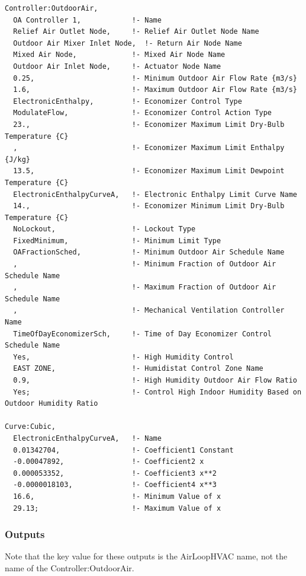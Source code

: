 \begin{lstlisting}
Controller:OutdoorAir,
  OA Controller 1,            !- Name
  Relief Air Outlet Node,     !- Relief Air Outlet Node Name
  Outdoor Air Mixer Inlet Node,  !- Return Air Node Name
  Mixed Air Node,             !- Mixed Air Node Name
  Outdoor Air Inlet Node,     !- Actuator Node Name
  0.25,                       !- Minimum Outdoor Air Flow Rate {m3/s}
  1.6,                        !- Maximum Outdoor Air Flow Rate {m3/s}
  ElectronicEnthalpy,         !- Economizer Control Type
  ModulateFlow,               !- Economizer Control Action Type
  23.,                        !- Economizer Maximum Limit Dry-Bulb Temperature {C}
  ,                           !- Economizer Maximum Limit Enthalpy {J/kg}
  13.5,                       !- Economizer Maximum Limit Dewpoint Temperature {C}
  ElectronicEnthalpyCurveA,   !- Electronic Enthalpy Limit Curve Name
  14.,                        !- Economizer Minimum Limit Dry-Bulb Temperature {C}
  NoLockout,                  !- Lockout Type
  FixedMinimum,               !- Minimum Limit Type
  OAFractionSched,            !- Minimum Outdoor Air Schedule Name
  ,                           !- Minimum Fraction of Outdoor Air Schedule Name
  ,                           !- Maximum Fraction of Outdoor Air Schedule Name
  ,                           !- Mechanical Ventilation Controller Name
  TimeOfDayEconomizerSch,     !- Time of Day Economizer Control Schedule Name
  Yes,                        !- High Humidity Control
  EAST ZONE,                  !- Humidistat Control Zone Name
  0.9,                        !- High Humidity Outdoor Air Flow Ratio
  Yes;                        !- Control High Indoor Humidity Based on Outdoor Humidity Ratio

Curve:Cubic,
  ElectronicEnthalpyCurveA,   !- Name
  0.01342704,                 !- Coefficient1 Constant
  -0.00047892,                !- Coefficient2 x
  0.000053352,                !- Coefficient3 x**2
  -0.0000018103,              !- Coefficient4 x**3
  16.6,                       !- Minimum Value of x
  29.13;                      !- Maximum Value of x
\end{lstlisting}

\subsubsection{Outputs}\label{outputs-005}

Note that the key value for these outputs is the AirLoopHVAC name, not the name of the Controller:OutdoorAir.

